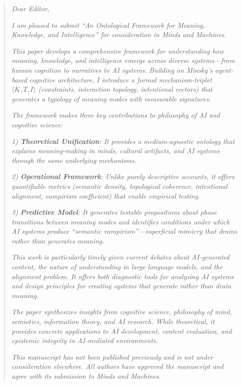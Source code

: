 \documentclass[12pt]{article}
\begin{document}
\begin{quote}
\textit{Dear Editor,}

\textit{I am pleased to submit ``An Ontological Framework for Meaning, Knowledge, and Intelligence'' for consideration in Minds and Machines.}

\textit{This paper develops a comprehensive framework for understanding how meaning, knowledge, and intelligence emerge across diverse systems—from human cognition to narratives to AI systems. Building on Minsky's agent-based cognitive architecture, I introduce a formal mechanism-triplet $\langle K, T, I \rangle$ (constraints, interaction topology, intentional vectors) that generates a typology of meaning modes with measurable signatures.}

\textit{The framework makes three key contributions to philosophy of AI and cognitive science:}

\textit{1) \textbf{Theoretical Unification}: It provides a medium-agnostic ontology that explains meaning-making in minds, cultural artifacts, and AI systems through the same underlying mechanisms.}

\textit{2) \textbf{Operational Framework}: Unlike purely descriptive accounts, it offers quantifiable metrics (semantic density, topological coherence, intentional alignment, vampirism coefficient) that enable empirical testing.}

\textit{3) \textbf{Predictive Model}: It generates testable propositions about phase transitions between meaning modes and identifies conditions under which AI systems produce ``semantic vampirism''—superficial mimicry that drains rather than generates meaning.}

\textit{This work is particularly timely given current debates about AI-generated content, the nature of understanding in large language models, and the alignment problem. It offers both diagnostic tools for analyzing AI systems and design principles for creating systems that generate rather than drain meaning.}

\textit{The paper synthesizes insights from cognitive science, philosophy of mind, semiotics, information theory, and AI research. While theoretical, it provides concrete applications to AI development, content evaluation, and epistemic integrity in AI-mediated environments.}

\textit{This manuscript has not been published previously and is not under consideration elsewhere. All authors have approved the manuscript and agree with its submission to Minds and Machines.}


\end{quote}
\end{document}
